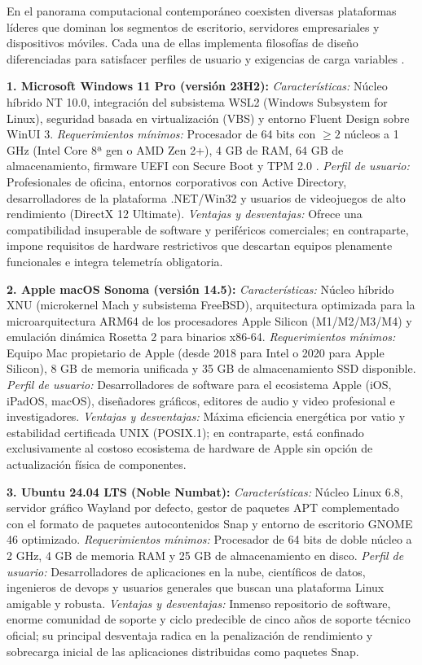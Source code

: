 \documentclass[12pt]{article}
\begin{document}
En el panorama computacional contemporáneo coexisten diversas plataformas líderes que dominan los segmentos de escritorio, servidores empresariales y dispositivos móviles. Cada una de ellas implementa filosofías de diseño diferenciadas para satisfacer perfiles de usuario y exigencias de carga variables \parencite[\S 2.4, p.\ 84]{stallings2018operating}.

\smallskip
\noindent\textbf{1. Microsoft Windows 11 Pro (versión 23H2):}
\textit{Características:} Núcleo híbrido NT 10.0, integración del subsistema WSL2 (Windows Subsystem for Linux), seguridad basada en virtualización (VBS) y entorno Fluent Design sobre WinUI 3.
\textit{Requerimientos mínimos:} Procesador de 64 bits con $\ge 2$ núcleos a 1 GHz (Intel Core 8ª gen o AMD Zen 2+), 4 GB de RAM, 64 GB de almacenamiento, firmware UEFI con Secure Boot y TPM 2.0 \parencite{microsoftWindows11}.
\textit{Perfil de usuario:} Profesionales de oficina, entornos corporativos con Active Directory, desarrolladores de la plataforma .NET/Win32 y usuarios de videojuegos de alto rendimiento (DirectX 12 Ultimate).
\textit{Ventajas y desventajas:} Ofrece una compatibilidad insuperable de software y periféricos comerciales; en contraparte, impone requisitos de hardware restrictivos que descartan equipos plenamente funcionales e integra telemetría obligatoria.

\smallskip
\noindent\textbf{2. Apple macOS Sonoma (versión 14.5):}
\textit{Características:} Núcleo híbrido XNU (microkernel Mach y subsistema FreeBSD), arquitectura optimizada para la microarquitectura ARM64 de los procesadores Apple Silicon (M1/M2/M3/M4) y emulación dinámica Rosetta 2 para binarios x86-64.
\textit{Requerimientos mínimos:} Equipo Mac propietario de Apple (desde 2018 para Intel o 2020 para Apple Silicon), 8 GB de memoria unificada y 35 GB de almacenamiento SSD disponible.
\textit{Perfil de usuario:} Desarrolladores de software para el ecosistema Apple (iOS, iPadOS, macOS), diseñadores gráficos, editores de audio y video profesional e investigadores.
\textit{Ventajas y desventajas:} Máxima eficiencia energética por vatio y estabilidad certificada UNIX (POSIX.1); en contraparte, está confinado exclusivamente al costoso ecosistema de hardware de Apple sin opción de actualización física de componentes.

\smallskip
\noindent\textbf{3. Ubuntu 24.04 LTS (Noble Numbat):}
\textit{Características:} Núcleo Linux 6.8, servidor gráfico Wayland por defecto, gestor de paquetes APT complementado con el formato de paquetes autocontenidos Snap y entorno de escritorio GNOME 46 optimizado.
\textit{Requerimientos mínimos:} Procesador de 64 bits de doble núcleo a 2 GHz, 4 GB de memoria RAM y 25 GB de almacenamiento en disco.
\textit{Perfil de usuario:} Desarrolladores de aplicaciones en la nube, científicos de datos, ingenieros de devops y usuarios generales que buscan una plataforma Linux amigable y robusta.
\textit{Ventajas y desventajas:} Inmenso repositorio de software, enorme comunidad de soporte y ciclo predecible de cinco años de soporte técnico oficial; su principal desventaja radica en la penalización de rendimiento y sobrecarga inicial de las aplicaciones distribuidas como paquetes Snap.
\end{document}

